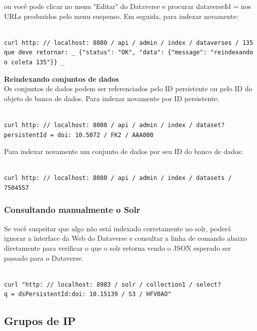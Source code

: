 \documentclass[12pt,hidelinks]{article}
\begin{document}
ou você pode clicar no menu "Editar" do Dataverse e procurar dataverseId = nos URLs produzidos pelo menu suspenso. Em seguida, para indexar novamente:

\begin{verbatim}

curl http: // localhost: 8080 / api / admin / index / dataverses / 135
que deve retornar: _ {"status": "OK", "data": {"message": "reindexando
o coleta 135"}} _

\end{verbatim}

\textbf{Reindexando conjuntos de dados}\\

Os conjuntos de dados podem ser referenciados pelo ID persistente ou pelo ID do objeto de banco de dados. Para indexar novamente por ID persistente:

\begin{verbatim}

curl http: // localhost: 8080 / api / admin / index / dataset?
persistentId = doi: 10.5072 / FK2 / AAA000

\end{verbatim}

Para indexar novamente um conjunto de dados por seu ID do banco de dados:

\begin{verbatim}

curl http: // localhost: 8080 / api / admin / index / datasets / 7504557

\end{verbatim}

\subsubsection{Consultando manualmente o Solr}

\qquad Se você suspeitar que algo não está indexado corretamente no solr, poderá ignorar a interface da Web do Dataverse e consultar a linha de comando abaixo diretamente para verificar o que o solr retorna vendo o JSON esperado ser passado para o Dataverse.

\begin{verbatim}

curl "http: // localhost: 8983 / solr / collection1 / select? 
q = dsPersistentId:doi: 10.15139 / S3 / HFV0AO"

\end{verbatim}

\subsection{Grupos de IP}
\end{document}
